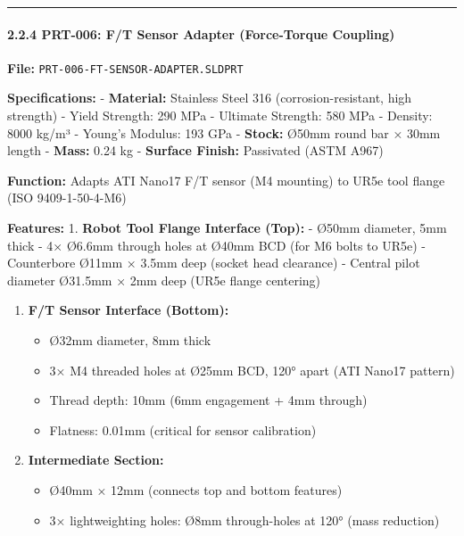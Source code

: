 \documentclass[
]{article}
\providecommand{\tightlist}{%
  \setlength{\itemsep}{0pt}\setlength{\parskip}{0pt}}
\begin{document}
\begin{center}\rule{0.5\linewidth}{0.5pt}\end{center}

\hypertarget{prt-006-ft-sensor-adapter-force-torque-coupling}{%
\paragraph{2.2.4 PRT-006: F/T Sensor Adapter (Force-Torque
Coupling)}\label{prt-006-ft-sensor-adapter-force-torque-coupling}}

\textbf{File:} \texttt{PRT-006-FT-SENSOR-ADAPTER.SLDPRT}

\textbf{Specifications:} - \textbf{Material:} Stainless Steel 316
(corrosion-resistant, high strength) - Yield Strength: 290 MPa -
Ultimate Strength: 580 MPa - Density: 8000 kg/m³ - Young's Modulus: 193
GPa - \textbf{Stock:} Ø50mm round bar × 30mm length - \textbf{Mass:}
0.24 kg - \textbf{Surface Finish:} Passivated (ASTM A967)

\textbf{Function:} Adapts ATI Nano17 F/T sensor (M4 mounting) to UR5e
tool flange (ISO 9409-1-50-4-M6)

\textbf{Features:} 1. \textbf{Robot Tool Flange Interface (Top):} -
Ø50mm diameter, 5mm thick - 4× Ø6.6mm through holes at Ø40mm BCD (for M6
bolts to UR5e) - Counterbore Ø11mm × 3.5mm deep (socket head clearance)
- Central pilot diameter Ø31.5mm × 2mm deep (UR5e flange centering)

\begin{enumerate}
\def\labelenumi{\arabic{enumi}.}
\setcounter{enumi}{1}
\tightlist
\item
  \textbf{F/T Sensor Interface (Bottom):}

  \begin{itemize}
  \tightlist
  \item
    Ø32mm diameter, 8mm thick
  \item
    3× M4 threaded holes at Ø25mm BCD, 120° apart (ATI Nano17 pattern)
  \item
    Thread depth: 10mm (6mm engagement + 4mm through)
  \item
    Flatness: 0.01mm (critical for sensor calibration)
  \end{itemize}
\item
  \textbf{Intermediate Section:}

  \begin{itemize}
  \tightlist
  \item
    Ø40mm × 12mm (connects top and bottom features)
  \item
    3× lightweighting holes: Ø8mm through-holes at 120° (mass reduction)
  \end{itemize}
\end{enumerate}
\end{document}
